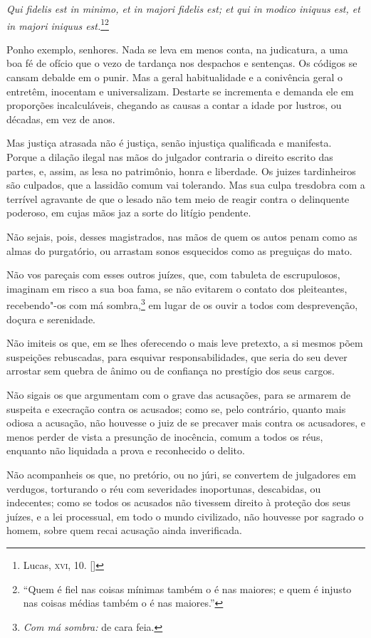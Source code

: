 \textit{Qui fidelis est in minimo, et in majori fidelis est; et
qui in modico iniquus est, et in majori iniquus
est.}\footnote[*]{ Lucas, \textsc{xvi}, 10. []}\footnote{“Quem é fiel nas coisas mínimas também o é nas maiores; e quem é injusto nas
coisas médias também o é nas maiores.”} 

Ponho exemplo, senhores. Nada se leva em menos conta, na
judicatura, a uma boa fé de ofício que o vezo de tardança nos despachos
e sentenças. Os códigos se cansam debalde em o punir. Mas a geral
habitualidade e a conivência geral o entretêm, inocentam e
universalizam. Destarte se incrementa e demanda ele em proporções
incalculáveis, chegando as causas a contar a idade por lustros, ou
décadas, em vez de anos.

Mas justiça atrasada não é justiça, senão injustiça qualificada e
manifesta. Porque a dilação ilegal nas mãos do julgador contraria o
direito escrito das partes, e, assim, as lesa no patrimônio, honra e
liberdade. Os juizes tardinheiros são culpados, que a lassidão comum
vai tolerando. Mas sua culpa tresdobra com a terrível agravante de que
o lesado não tem meio de reagir contra o delinquente poderoso, em cujas
mãos jaz a sorte do litígio pendente.

Não sejais, pois, desses magistrados, nas mãos de quem os autos
penam como as almas do purgatório, ou arrastam sonos esquecidos como as
preguiças do mato.

Não vos pareçais com esses outros juízes, que, com tabuleta de
escrupulosos, imaginam em risco a sua boa fama, se não evitarem o
contato dos pleiteantes, recebendo"-os com má sombra,\footnote{ \textit{Com má sombra:} 
de cara feia.} em lugar de os
ouvir a todos com desprevenção, doçura e serenidade.

Não imiteis os que, em se lhes oferecendo o mais leve pretexto, a
si mesmos põem suspeições rebuscadas, para esquivar responsabilidades,
que seria do seu dever arrostar sem quebra de ânimo ou de confiança no
prestígio dos seus cargos.

Não sigais os que argumentam com o grave das acusações, para se
armarem de suspeita e execração contra os acusados; como se, pelo
contrário, quanto mais odiosa a acusação, não houvesse o juiz de se
precaver mais contra os acusadores, e menos perder de vista a presunção
de inocência, comum a todos os réus, enquanto não liquidada a prova e
reconhecido o delito.

Não acompanheis os que, no pretório, ou no júri, se convertem de
julgadores em verdugos, torturando o réu com severidades inoportunas,
descabidas, ou indecentes; como se todos os acusados não tivessem
direito à proteção dos seus juízes, e a lei processual, em todo o mundo
civilizado, não houvesse por sagrado o homem, sobre quem recai acusação
ainda inverificada.

